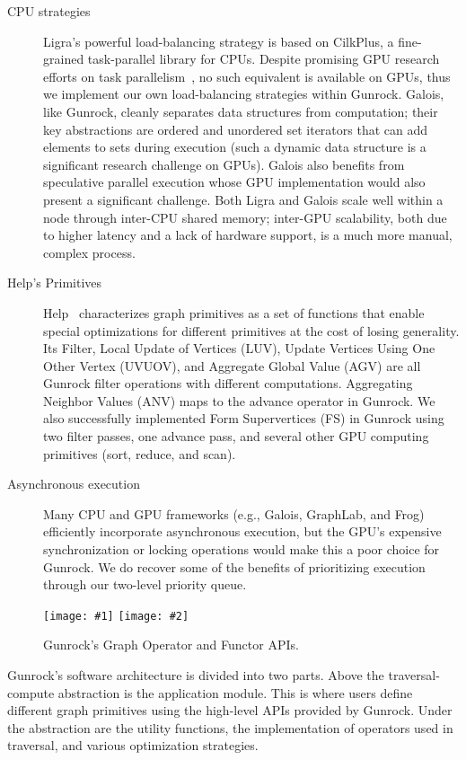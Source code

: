 \documentclass[format=acmsmall,review=false,screen=true]{acmart}
\newcommand\TwoFigOneCaption[4]{%
  \sbox\IBoxA{\texttt{[image: \#1]}}
  \sbox\IBoxB{\texttt{[image: \#2]}}%
  \ifdim\ht\IBoxA>\ht\IBoxB
    \setlength\IHeight{\ht\IBoxB}\else\setlength\IHeight{\ht\IBoxA}\fi%
  \begin{figure}[!htb]
  \minipage[t]{0.49\textwidth}\centering
  \texttt{[image: \#1]}
  \endminipage\hfill
  \minipage[t]{0.49\textwidth}\centering
  \texttt{[image: \#2]}
  \endminipage
  \caption{#3}\label{#4}
  \end{figure}%
}
\begin{document}
\begin{description}
\item[CPU strategies] Ligra's powerful load-balancing strategy is
  based on CilkPlus, a fine-grained task-parallel library for CPUs.
  Despite promising GPU research efforts on task
  parallelism~\cite{Cederman:2008:ODL,Tzeng:2012:AGT}, no such
  equivalent is available on GPUs, thus we implement our own
  load-balancing strategies within Gunrock. Galois, like Gunrock,
  cleanly separates data structures from computation; their key
  abstractions are ordered and unordered set iterators that can add
  elements to sets during execution (such a dynamic data structure is
  a significant research challenge on GPUs). Galois also benefits from
  speculative parallel execution whose GPU implementation would also
  present a significant challenge. Both Ligra and Galois scale well
  within a node through inter-CPU shared memory; inter-GPU
  scalability, both due to higher latency and a lack of hardware
  support, is a much more manual, complex process.

\item[Help's Primitives] Help~\cite{Salihoglu:2014:HHP} characterizes
  graph primitives as a set of functions that enable special
  optimizations for different primitives at the cost of losing
  generality. Its Filter, Local Update of Vertices (LUV), Update
  Vertices Using One Other Vertex (UVUOV), and Aggregate Global Value
  (AGV) are all Gunrock filter operations with different computations.
  Aggregating Neighbor Values (ANV) maps to the advance operator in
  Gunrock. We also successfully implemented Form Supervertices (FS) in
  Gunrock using two filter passes, one advance pass, and several other
  GPU computing primitives (sort, reduce, and scan).

\item[Asynchronous execution] Many CPU and GPU frameworks (e.g.,
  Galois, GraphLab, and Frog) efficiently incorporate asynchronous
  execution, but the GPU's expensive synchronization or locking
  operations would make this a poor choice for Gunrock. We do recover
  some of the benefits of prioritizing execution through our two-level
  priority queue.

\end{description}

\TwoFigOneCaption{l2.pdf}
{l1.pdf}
{Gunrock's Graph Operator and Functor APIs.}
{fig:api}

Gunrock's software architecture is divided into two parts. Above the
traversal-compute abstraction is the application module. This is where
users define different graph primitives using the high-level APIs
provided by Gunrock. Under the abstraction are the utility functions,
the implementation of operators used in traversal, and various
optimization strategies.
\end{document}

